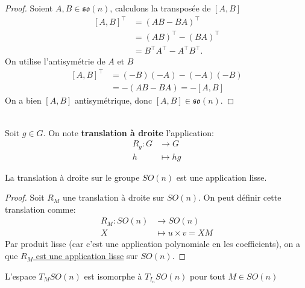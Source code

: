 \documentclass[12pt]{report}
\begin{document}
\begin{proof}
Soient $A,B\in \mathfrak{so}(n)$, calculons la transposée de $[A,B]$
\[
\begin{aligned}
{[A,B]}^{\top}&={(AB-BA)}^{\top}\\
&={(AB)}^{\top}-{(BA)}^{\top}\\
&=B^{\top}A^{\top}-A^{\top}B^{\top}.
\end{aligned}
\]
On utilise l'antisymétrie de $A$ et $B$
\[
\begin{aligned}
{[A,B]}^{\top}&=(-B)(-A)-(-A)(-B)\\
&=-(AB-BA)=-[A,B]
\end{aligned}
\]
On a bien $[A,B]$ antisymétrique, donc \underline{$[A,B]\in\mathfrak{so}(n)$}.
\end{proof}

\begin{definition}\label{def:translation}\leavevmode\\
Soit $g\in G$. On note \textbf{translation à droite} l'application:
\[
\begin{aligned}
R_g\colon G &\longrightarrow G\\
h&\longmapsto hg
\end{aligned}
\]
\end{definition}

\begin{proposition}\label{prop:translation-lisse}
La translation à droite sur le groupe $SO(n)$ est une application lisse.
\end{proposition}

\begin{proof}
Soit $R_M$ une translation à droite sur $SO(n)$. On peut définir cette translation comme:
\[
\begin{aligned}
R_M\colon SO(n) &\longrightarrow SO(n)\\
X&\longmapsto u\times v=XM
\end{aligned}
\]
Par produit lisse (car c'est une application polynomiale en les coefficients), on a que \underline{$R_M$ est une application lisse} sur $SO(n)$.
\end{proof}

\begin{proposition}\label{prop:Tangent-isomorphe}
L'espace $T_{M}SO(n)$ est isomorphe à $T_{I_n}SO(n)$ pour tout $M\in SO(n)$
\end{proposition}
\end{document}
